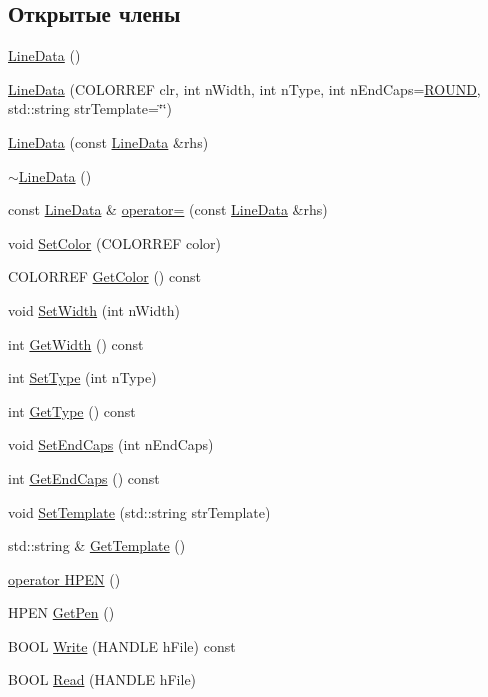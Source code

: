 \subsection*{Открытые члены}
\begin{DoxyCompactItemize}
\item 
\hyperlink{class_line_data_af4d6ef9378681b4dd72ccac52c8f4e47}{Line\-Data} ()
\item 
\hyperlink{class_line_data_ac9b85808f69d4f6cfe3741bbfcd65da6}{Line\-Data} (C\-O\-L\-O\-R\-R\-E\-F clr, int n\-Width, int n\-Type, int n\-End\-Caps=\hyperlink{class_line_data_af2e2ee6851256e24a12203eda9402beaaab3bff3f6a4c9347d819e65d05f5fec3}{R\-O\-U\-N\-D}, std\-::string str\-Template=\char`\"{}\char`\"{})
\item 
\hyperlink{class_line_data_a4125b467a9d8d880027c36f8a04ec188}{Line\-Data} (const \hyperlink{class_line_data}{Line\-Data} \&rhs)
\item 
\hyperlink{class_line_data_a8cb45a237eeea2c7c49a8344286e8ab4}{$\sim$\-Line\-Data} ()
\item 
const \hyperlink{class_line_data}{Line\-Data} \& \hyperlink{class_line_data_abb21b7f48aa99ace40cfdff6965fb9df}{operator=} (const \hyperlink{class_line_data}{Line\-Data} \&rhs)
\item 
void \hyperlink{class_line_data_a4590c5b7fb46b8f9194e34ba67642b09}{Set\-Color} (C\-O\-L\-O\-R\-R\-E\-F color)
\item 
C\-O\-L\-O\-R\-R\-E\-F \hyperlink{class_line_data_a207269015f81f59b4dbc32bd402f5d2c}{Get\-Color} () const 
\item 
void \hyperlink{class_line_data_ad60bf3e430a63d31c086c393178c01c5}{Set\-Width} (int n\-Width)
\item 
int \hyperlink{class_line_data_a3fcb7592c8bca72b953fda51b0432d75}{Get\-Width} () const 
\item 
int \hyperlink{class_line_data_af1c04fa13836884d9cb64e8fc3387370}{Set\-Type} (int n\-Type)
\item 
int \hyperlink{class_line_data_af15a08103fa48085eb4ad0ab4888988f}{Get\-Type} () const 
\item 
void \hyperlink{class_line_data_a992ddca82ec4472929a7cf7c613a3619}{Set\-End\-Caps} (int n\-End\-Caps)
\item 
int \hyperlink{class_line_data_ae6cfbcfa7fd82a8a4d4df981cef33f01}{Get\-End\-Caps} () const 
\item 
void \hyperlink{class_line_data_a8ecfe5b4b82f1d4b0d67c1e773b60246}{Set\-Template} (std\-::string str\-Template)
\item 
std\-::string \& \hyperlink{class_line_data_abee244a667b9543d42eb1170fff9682d}{Get\-Template} ()
\item 
\hyperlink{class_line_data_aaaddb4cdac3046ec53caa1e01e91369c}{operator H\-P\-E\-N} ()
\item 
H\-P\-E\-N \hyperlink{class_line_data_a29bc4b864d24ccd29f2edd397f546670}{Get\-Pen} ()
\item 
B\-O\-O\-L \hyperlink{class_line_data_a849c0984d5faba99bb2fa351d6a30801}{Write} (H\-A\-N\-D\-L\-E h\-File) const 
\item 
B\-O\-O\-L \hyperlink{class_line_data_a06d80ee01d05207cf4470dc37662a733}{Read} (H\-A\-N\-D\-L\-E h\-File)
\end{DoxyCompactItemize}
